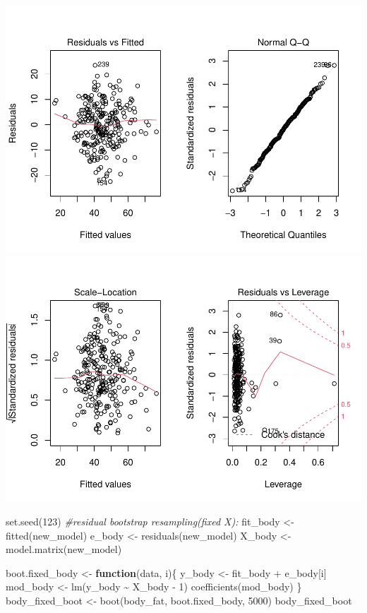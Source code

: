 \documentclass[
]{article}
\newenvironment{Shaded}{\begin{snugshade}}{\end{snugshade}}
\newcommand{\CommentTok}[1]{\textcolor[rgb]{0.56,0.35,0.01}{\textit{#1}}}
\newcommand{\ControlFlowTok}[1]{\textcolor[rgb]{0.13,0.29,0.53}{\textbf{#1}}}
\newcommand{\DecValTok}[1]{\textcolor[rgb]{0.00,0.00,0.81}{#1}}
\newcommand{\FunctionTok}[1]{\textcolor[rgb]{0.00,0.00,0.00}{#1}}
\newcommand{\NormalTok}[1]{#1}
\newcommand{\OtherTok}[1]{\textcolor[rgb]{0.56,0.35,0.01}{#1}}
\newcommand{\SpecialCharTok}[1]{\textcolor[rgb]{0.00,0.00,0.00}{#1}}
\begin{document}
\includegraphics{STAT641_Final_Report_files/figure-latex/unnamed-chunk-7-1.pdf}
\includegraphics{STAT641_Final_Report_files/figure-latex/unnamed-chunk-7-2.pdf}

\neapage

\begin{Shaded}
\begin{Highlighting}[]
\FunctionTok{set.seed}\NormalTok{(}\DecValTok{123}\NormalTok{)}
\CommentTok{\#residual bootstrap resampling(fixed X):}
\NormalTok{fit\_body }\OtherTok{\textless{}{-}} \FunctionTok{fitted}\NormalTok{(new\_model)}
\NormalTok{e\_body }\OtherTok{\textless{}{-}} \FunctionTok{residuals}\NormalTok{(new\_model)}
\NormalTok{X\_body }\OtherTok{\textless{}{-}} \FunctionTok{model.matrix}\NormalTok{(new\_model)}

\NormalTok{boot.fixed\_body }\OtherTok{\textless{}{-}} \ControlFlowTok{function}\NormalTok{(data, i)\{}
\NormalTok{  y\_body }\OtherTok{\textless{}{-}}\NormalTok{ fit\_body }\SpecialCharTok{+}\NormalTok{ e\_body[i]}
\NormalTok{  mod\_body }\OtherTok{\textless{}{-}} \FunctionTok{lm}\NormalTok{(y\_body }\SpecialCharTok{\textasciitilde{}}\NormalTok{ X\_body }\SpecialCharTok{{-}} \DecValTok{1}\NormalTok{)}
  \FunctionTok{coefficients}\NormalTok{(mod\_body)}
\NormalTok{\}}
\NormalTok{body\_fixed\_boot }\OtherTok{\textless{}{-}} \FunctionTok{boot}\NormalTok{(body\_fat, boot.fixed\_body, }\DecValTok{5000}\NormalTok{)}
\NormalTok{body\_fixed\_boot}
\end{Highlighting}
\end{Shaded}
\end{document}

